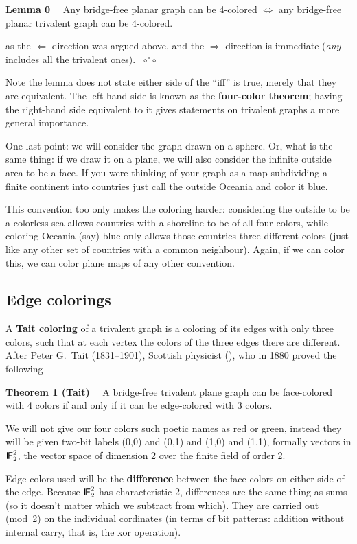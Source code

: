 \documentclass[12pt]{article}
\let\uml\"              %
\def\trema#1{\discretionary{-}{#1}{\uml #1}}
\let\S\scriptstyle
\let\SS\scriptscriptstyle
\def\sfmath#1{{\mathchoice%
{{\sf #1}}{{\sf #1}}{{\S\sf #1}}{{\SS\sf #1}}}}
\def\Stalkset#1{\sfmath{I\kern-.12em#1}}
\def\Fset{\Stalkset F}
\let\so\Longrightarrow
\let\oso\Longleftrightarrow
\let\os\Longleftarrow
\def\qed{ ${\S\circ}\!{}^\circ\!{\S\circ}$}
\def\oord/{o{\trema o}rdin\-ate}
\begin{document}
{\bf Lemma 0}$\quad$ Any bridge-free planar graph can be 4-colored $\oso$
any bridge-free planar trivalent graph can be 4-colored.

as the $\os$ direction was argued above, and the $\so$ direction is
immediate ({\em any\/} includes all the trivalent ones).~\qed

Note the lemma does not state either side of the ``iff\/'' is true, merely
that they are equivalent. The left-hand side is known as the {\bf four-color
theorem}; having the right-hand side equivalent to it gives statements on
trivalent graphs a more general importance.

\vfill\pagebreak
One last point: we will consider the graph drawn on a sphere. Or, what is the
same thing: if we draw it on a plane, we will also consider the infinite outside
area to be a face. If you were thinking of your graph as a map subdividing a
finite continent into countries just call the outside Oceania and color it
blue.

This convention too only makes the coloring harder: considering the outside to
be a colorless sea allows countries with a shoreline to be of all four colors,
while coloring Oceania (say) blue only allows those countries three different
colors (just like any other set of countries with a common neighbour). Again,
if we can color this, we can color plane maps of any other convention.

\vfill\pagebreak
\subsection*{Edge colorings}

A {\bf Tait coloring} of a trivalent graph is a coloring of its edges with
only three colors, such that at each vertex the colors of the three edges
there are different. After Peter G.\ Tait (1831--1901), Scottish physicist (), who in 1880 proved the following

{\bf Theorem 1 (Tait)}$\quad$ A bridge-free trivalent plane graph can be
face-colored with 4 colors if and only if it can be edge-colored with 3
colors.

We will not give our four colors such poetic names as red or green, instead
they will be given two-bit labels (0,0) and (0,1) and (1,0) and (1,1), formally
vectors in $\Fset_2^2$, the vector space of dimension 2 over the finite field
of order 2.

Edge colors used will be the {\bf difference} between the face colors on
either side of the edge. Because $\Fset_2^2$ has characteristic 2, differences
are the same thing as sums (so it doesn't matter which we subtract from which).
They are carried out (mod~2) on the individual c\oord/s (in terms of bit
patterns: addition without internal carry, that is, the {\sc xor} operation).
\end{document}

